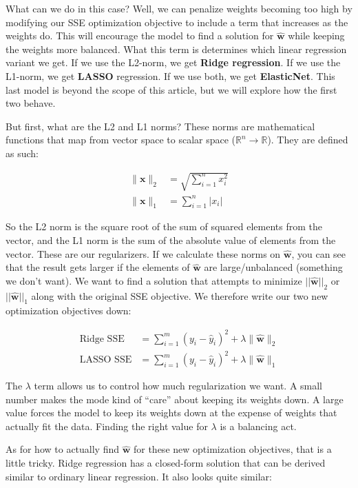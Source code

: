     What can we do in this case? Well, we can penalize weights becoming too high by modifying our SSE optimization objective to include a term that increases as the weights do. This will encourage the model to find a solution for $\hat{\textbf{w}}$ while keeping the weights more balanced. What this term is determines which linear regression variant we get. If we use the L2-norm, we get \textbf{Ridge regression}. If we use the L1-norm, we get \textbf{LASSO} regression. If we use both, we get \textbf{ElasticNet}. This last model is beyond the scope of this article, but we will explore how the first two behave.

    But first, what are the L2 and L1 norms? These norms are mathematical functions that map from vector space to scalar space ($\mathbb{R}^n \rightarrow \mathbb{R}$). They are defined as such:

    \begin{align*}
      \|\textbf{x}\|_2 &= \sqrt{\sum_{i=1}^n x_i^2} \\
      \|\textbf{x}\|_1 &= \sum_{i=1}^n \vert x_i \vert
    \end{align*}

    So the L2 norm is the square root of the sum of squared elements from the vector, and the L1 norm is the sum of the absolute value of elements from the vector. These are our regularizers. If we calculate these norms on $\hat{\textbf{w}}$, you can see that the result gets larger if the elements of $\hat{\textbf{w}}$ are large/unbalanced (something we don't want). We want to find a solution that attempts to minimize $||\hat{\textbf{w}}||_2$ or $||\hat{\textbf{w}}||_1$ along with the original SSE objective. We therefore write our two new optimization objectives down:

    \begin{align*}
      \text{Ridge SSE} &= \sum_{i=1}^{m} (y_i - \hat{y}_i)^2 + \lambda\|\hat{\textbf{w}}\|_2 \\
      \text{LASSO SSE} &= \sum_{i=1}^{m} (y_i - \hat{y}_i)^2 + \lambda\|\hat{\textbf{w}}\|_1
    \end{align*}

    The $\lambda$ term allows us to control how much regularization we want. A small number makes the mode kind of ``care'' about keeping its weights down. A large value forces the model to keep its weights down at the expense of weights that actually fit the data. Finding the right value for $\lambda$ is a balancing act.

    As for how to actually find $\hat{\textbf{w}}$ for these new optimization objectives, that is a little tricky. Ridge regression has a closed-form solution that can be derived similar to ordinary linear regression. It also looks quite similar:


